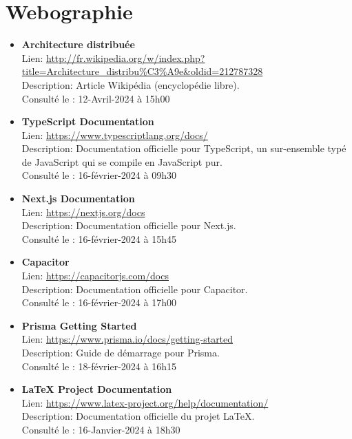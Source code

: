 \documentclass[12pt,french]{extreport}
\begin{document}
\label{sec:tableofcontents}
\tableofcontents

\printbibliography
\label{sec:bibliographie}

\chapter*{Webographie}
\label{sec:webographie}
\begin{itemize}
    \item \textbf{Architecture distribuée} \\
    Lien: \url{http://fr.wikipedia.org/w/index.php?title=Architecture_distribu%C3%A9e&oldid=212787328} \\
    Description: Article Wikipédia (encyclopédie libre). \\
    Consulté le : 12-Avril-2024 à 15h00

    \item \textbf{TypeScript Documentation} \\
    Lien: \url{https://www.typescriptlang.org/docs/} \\
    Description: Documentation officielle pour TypeScript, un sur-ensemble typé de JavaScript qui se compile en JavaScript pur. \\
    Consulté le : 16-février-2024 à 09h30

    \item \textbf{Next.js Documentation} \\
    Lien: \url{https://nextjs.org/docs} \\
    Description: Documentation officielle pour Next.js. \\
    Consulté le : 16-février-2024 à 15h45

    \item \textbf{Capacitor} \\
    Lien: \url{https://capacitorjs.com/docs} \\
    Description: Documentation officielle pour Capacitor. \\
    Consulté le : 16-février-2024 à 17h00

    \item \textbf{Prisma Getting Started} \\
    Lien: \url{https://www.prisma.io/docs/getting-started} \\
    Description: Guide de démarrage pour Prisma. \\
    Consulté le : 18-février-2024 à 16h15

    \item \textbf{LaTeX Project Documentation} \\
    Lien: \url{https://www.latex-project.org/help/documentation/} \\
    Description: Documentation officielle du projet LaTeX. \\
    Consulté le : 16-Janvier-2024 à 18h30


\end{itemize}
\end{document}
